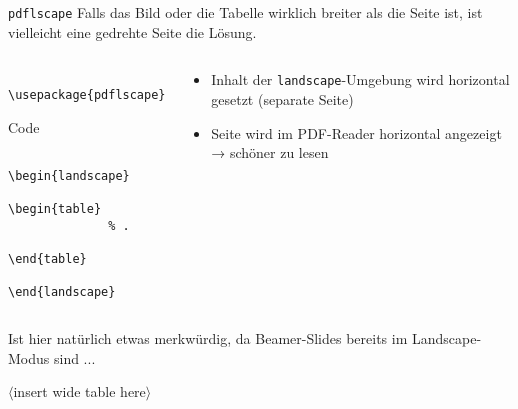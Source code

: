 \begin{frame}[fragile]{\texttt{pdflscape}}
  Falls das Bild oder die Tabelle wirklich breiter als die Seite ist, ist vielleicht eine gedrehte Seite die Lösung.
  \begin{columns}[onlytextwidth, t]
    \begin{column}{0.50\textwidth}
      \begin{Packages}
        \begin{lstlisting}
          \usepackage{pdflscape}
        \end{lstlisting}
      \end{Packages}
      \begin{block}{Code}
        \begin{lstlisting}
          \begin{landscape}
            \begin{table}
              % .
            \end{table}
          \end{landscape}
        \end{lstlisting}
      \end{block}
    \end{column}
    \begin{column}{0.46\textwidth}
      \begin{itemize}
        \item Inhalt der \texttt{landscape}-Umgebung wird horizontal gesetzt (separate Seite)
        \item Seite wird im PDF-Reader horizontal angezeigt → schöner zu lesen
      \end{itemize}
    \end{column}
  \end{columns}
  Ist hier natürlich etwas merkwürdig, da Beamer-Slides bereits im Landscape-Modus sind ...
\end{frame}

\begin{landscape}
  \begin{frame}
    \centering
    $\langle$insert wide table here$\rangle$
  \end{frame}
\end{landscape}
